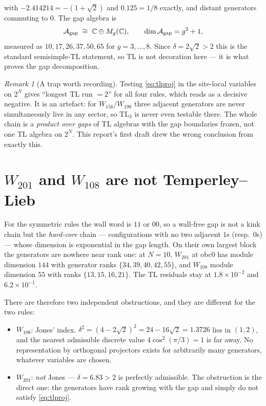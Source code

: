 \documentclass[11pt]{article}
\newcommand{\A}{\mathcal{A}}
\theoremstyle{plain}
\theoremstyle{remark}
\newtheorem{remark}{Remark}
\begin{document}
\noindent with $-2.414214 = -(1+\sqrt2)$ and $0.125 = 1/8$ exactly, and distant
generators commuting to $0$. The gap algebra is
\begin{equation}
  \A_{\rm gap} \;\cong\; \mathbb{C} \oplus M_g(\mathbb{C}),
  \qquad \dim \A_{\rm gap} = g^2 + 1,
\end{equation}
measured as $10, 17, 26, 37, 50, 65$ for $g = 3,\dots,8$. Since
$\delta = 2\sqrt2 > 2$ this is the standard semisimple-TL statement, so TL is not
decoration here --- it is what proves the gap decomposition.

\begin{remark}[A trap worth recording]
Testing \eqref{eq:tlproj} in the site-local variables on $2^N$ gives ``longest
TL run $= 2$'' for all four rules, which reads as a decisive negative. It is an
artefact: for $W_{156}/W_{198}$ three adjacent generators are never
simultaneously live in any sector, so $\mathrm{TL}_3$ is never even testable
there. The whole chain is a \emph{product over gaps} of TL algebras with the gap
boundaries frozen, not one TL algebra on $2^N$. This report's first draft drew
the wrong conclusion from exactly this.
\end{remark}

\section{\texorpdfstring{$W_{201}$ and $W_{108}$ are not Temperley--Lieb}%
{W201 and W108 are not Temperley-Lieb}}
\label{sec:notTL}

For the symmetric rules the wall word is $11$ or $00$, so a wall-free gap is not
a kink chain but the \emph{hard-core} chain --- configurations with no two
adjacent $1$s (resp.\ $0$s) --- whose dimension is exponential in the gap length.
On their own largest block the generators are nowhere near rank one: at $N=10$,
$W_{201}$ at obc0 has module dimension $144$ with generator ranks
$\{34,39,40,42,55\}$, and $W_{108}$ module dimension $55$ with ranks
$\{13,15,16,21\}$. The TL residuals stay at $1.8\times10^{-2}$ and
$6.2\times10^{-1}$.

There are therefore two independent obstructions, and they are different for the
two rules:
\begin{itemize}
\item $W_{108}$: Jones' index. $\delta^2 = (4-2\sqrt2)^2 = 24-16\sqrt2 = 1.3726$
lies in $(1,2)$, and the nearest admissible discrete value $4\cos^2(\pi/3) = 1$
is far away. No representation by orthogonal projectors exists for arbitrarily
many generators, whatever variables are chosen.
\item $W_{201}$: \emph{not} Jones --- $\delta = 6.83 > 2$ is perfectly
admissible. The obstruction is the direct one: the generators have rank growing
with the gap and simply do not satisfy \eqref{eq:tlproj}.
\end{itemize}
\end{document}
